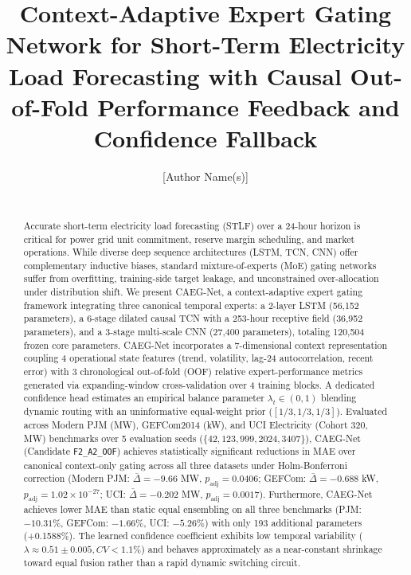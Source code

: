 \documentclass[journal,10pt,twocolumn]{IEEEtran}
\begin{document}
\title{Context-Adaptive Expert Gating Network for Short-Term Electricity Load Forecasting with Causal Out-of-Fold Performance Feedback and Confidence Fallback}

\author{[Author Name(s)]\\
[Department / Institution]\\
[Corresponding Author Email]}

\maketitle

\begin{abstract}
Accurate short-term electricity load forecasting (STLF) over a 24-hour horizon is critical for power grid unit commitment, reserve margin scheduling, and market operations. While diverse deep sequence architectures (LSTM, TCN, CNN) offer complementary inductive biases, standard mixture-of-experts (MoE) gating networks suffer from overfitting, training-side target leakage, and unconstrained over-allocation under distribution shift. We present CAEG-Net, a context-adaptive expert gating framework integrating three canonical temporal experts: a 2-layer LSTM (56,152 parameters), a 6-stage dilated causal TCN with a 253-hour receptive field (36,952 parameters), and a 3-stage multi-scale CNN (27,400 parameters), totaling 120,504 frozen core parameters. CAEG-Net incorporates a 7-dimensional context representation coupling 4 operational state features (trend, volatility, lag-24 autocorrelation, recent error) with 3 chronological out-of-fold (OOF) relative expert-performance metrics generated via expanding-window cross-validation over 4 training blocks. A dedicated confidence head estimates an empirical balance parameter $\lambda_t \in (0, 1)$ blending dynamic routing with an uninformative equal-weight prior ($[1/3, 1/3, 1/3]$). Evaluated across Modern PJM (MW), GEFCom2014 (kW), and UCI Electricity (Cohort 320, MW) benchmarks over 5 evaluation seeds ($\{42, 123, 999, 2024, 3407\}$), CAEG-Net (Candidate \texttt{F2\_A2\_OOF}) achieves statistically significant reductions in MAE over canonical context-only gating across all three datasets under Holm-Bonferroni correction (Modern PJM: $\bar{\Delta} = -9.66$ MW, $p_{\mathrm{adj}} = 0.0406$; GEFCom: $\bar{\Delta} = -0.688$ kW, $p_{\mathrm{adj}} = 1.02 \times 10^{-27}$; UCI: $\bar{\Delta} = -0.202$ MW, $p_{\mathrm{adj}} = 0.0017$). Furthermore, CAEG-Net achieves lower MAE than static equal ensembling on all three benchmarks (PJM: $-10.31\%$, GEFCom: $-1.66\%$, UCI: $-5.26\%$) with only 193 additional parameters (+0.1588\%). The learned confidence coefficient exhibits low temporal variability ($\lambda \approx 0.51 \pm 0.005, CV < 1.1\%$) and behaves approximately as a near-constant shrinkage toward equal fusion rather than a rapid dynamic switching circuit.
\end{abstract}
\end{document}
